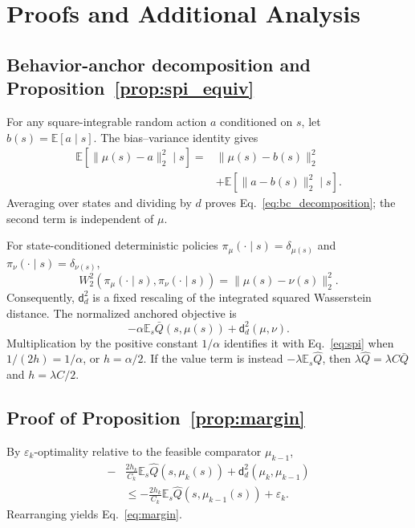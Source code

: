\appendix

\section{Proofs and Additional Analysis}
\label{app:proofs}

\subsection{Behavior-anchor decomposition and Proposition~\ref{prop:spi_equiv}}
For any square-integrable random action $a$ conditioned on $s$, let
$b(s)=\mathbb E[a\mid s]$. The bias--variance identity gives
\begin{equation}
\begin{split}
\mathbb E[\|\mu(s)-a\|_2^2\mid s]
={}&\|\mu(s)-b(s)\|_2^2\\
&+\mathbb E[\|a-b(s)\|_2^2\mid s].
\end{split}
\end{equation}
Averaging over states and dividing by $d$ proves
Eq.~\eqref{eq:bc_decomposition}; the second term is independent of $\mu$.

For state-conditioned deterministic policies
$\pi_\mu(\cdot\mid s)=\delta_{\mu(s)}$ and
$\pi_\nu(\cdot\mid s)=\delta_{\nu(s)}$,
\begin{equation}
W_2^2(\pi_\mu(\cdot\mid s),\pi_\nu(\cdot\mid s))
=\|\mu(s)-\nu(s)\|_2^2.
\end{equation}
Consequently, $\mathsf d_d^2$ is a fixed rescaling of the integrated squared
Wasserstein distance. The normalized anchored objective is
\begin{equation}
-\alpha\mathbb E_s\bar Q(s,\mu(s))
+\mathsf d_d^2(\mu,\nu).
\end{equation}
Multiplication by the positive constant $1/\alpha$ identifies it with
Eq.~\eqref{eq:spi} when $1/(2h)=1/\alpha$, or $h=\alpha/2$. If the value term
is instead $-\lambda\mathbb E_s\widehat Q$, then
$\lambda\widehat Q=\lambda C\bar Q$ and $h=\lambda C/2$.

\subsection{Proof of Proposition~\ref{prop:margin}}
By $\varepsilon_k$-optimality relative to the feasible comparator
$\mu_{k-1}$,
\begin{equation}
\begin{split}
-&\frac{2h_k}{C_k}\mathbb E_s\widehat Q(s,\mu_k(s))
+\mathsf d_d^2(\mu_k,\mu_{k-1})\\
&\leq
-\frac{2h_k}{C_k}\mathbb E_s\widehat Q(s,\mu_{k-1}(s))
+\varepsilon_k.
\end{split}
\end{equation}
Rearranging yields Eq.~\eqref{eq:margin}.

